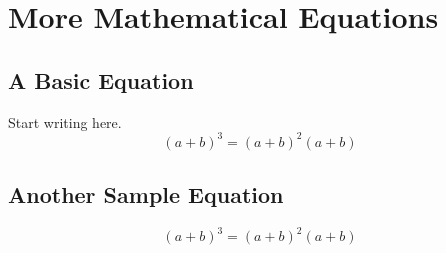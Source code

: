 \chapter{More Mathematical Equations}
\section{A Basic Equation}
Start writing here.
\begin{equation}
(a+b)^3 = (a+b)^2(a+b)
\end{equation}

\section{Another Sample Equation}
\begin{equation}
(a+b)^3 = (a+b)^2(a+b)
\end{equation}